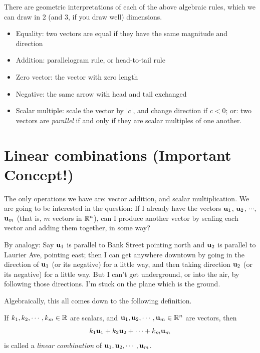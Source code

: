There are geometric interpretations of each of the above algebraic
rules, which we can draw in $2$ (and $3$, if you draw well) dimensions.
\begin{itemize}
\item Equality:  two vectors are equal if they have the same magnitude
and direction
\item Addition:  parallelogram rule, or head-to-tail rule 

\item Zero vector:  the vector with zero length
\item Negative: the same arrow with head and tail exchanged
\item Scalar multiple:  scale the vector by $\vert c \vert$, and change
direction if $c<0$; or:  two vectors are \emph{parallel} if and only if 
they are scalar multiples of one another.
\end{itemize}

\section{Linear combinations (Important Concept!)}
The only operations we have are:  vector addition, and scalar multiplication.
We are going to be interested in the question:  If I already have the
vectors $\mathbf{u}_1$, $\mathbf{u}_2$, $\cdots$, $\mathbf{u}_m$ (that is, $m$
vectors in $\mathbb{R}^n$), can I produce another  vector 
by scaling each vector and adding them together, in some way?

By analogy:  Say $\mathbf{u}_1$ is parallel to Bank Street pointing north 
and $\mathbf{u}_2$
is parallel to Laurier Ave, pointing east; then I can get anywhere downtown by 
going in the direction of $\mathbf{u}_1$ (or its negative) 
for a little way, and then taking direction $\mathbf{u}_2$ (or its
negative) for a little way.  But I can't get underground, or
into the air, by following those directions.  I'm stuck on the
plane which is the ground.

Algebraically, this all comes down to the following definition.

\begin{definition} 
If $k_1,k_2,\cdots, k_m \in \mathbb{R}$ are scalars, and $\mathbf{u}_1,\mathbf{u}_2,\cdots,\mathbf{u}_m\in \mathbb{R}^n$ are vectors, then 
$$
k_1\mathbf{u}_1+k_2\mathbf{u}_2 + \cdots + k_m\mathbf{u}_m 
$$
is called a \emph{linear combination} of $\mathbf{u}_1,\mathbf{u}_2,\cdots,\mathbf{u}_m$.
\end{definition}


